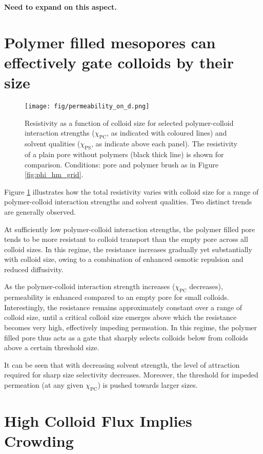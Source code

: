 \documentclass[12pt, a4paper]{article}
\begin{document}
\textbf{Need to expand on this aspect.}


\section{Polymer filled mesopores can effectively gate colloids by their size}

\begin{figure}
    \centering
    \texttt{[image: fig/permeability\_on\_d.png]}
    \caption{
    Resistivity as a function of colloid size for selected polymer-colloid interaction strengths ($\chi_{\text{PC}}$, as indicated with coloured lines) 
    and solvent qualities ($\chi_{\text{PS}}$, as indicate above each panel). 
    The resistivity of a plain pore without polymers (black thick line) is shown for comparison. 
    Conditions: pore and polymer brush as in Figure \ref{fig:phi_hm_grid}. 
    }
    \label{fig:R_vs_d}
\end{figure}

Figure \ref{fig:R_vs_d} illustrates how the total resistivity varies with colloid size for a range of polymer-colloid interaction strengths and solvent qualities. 
Two distinct trends are generally observed.

At sufficiently low polymer-colloid interaction strengths, the polymer filled pore tends to be more resistant to colloid transport than the empty pore across  all colloid sizes. 
In this regime, the resistance increases gradually yet substantially with colloid size, owing to a combination of enhanced osmotic repulsion and reduced diffusivity.

As the polymer-colloid interaction strength increases ($\chi_{\text{PC}}$ decreases), permeability is enhanced compared to an empty pore for small colloids. 
Interestingly, the resistance remains approximately constant over a range of colloid size, until a critical colloid size emerges above which the resistance becomes very high, 
effectively impeding permeation. 
In this regime, the polymer filled pore thus acts as a gate that sharply selects colloids below from colloids above a certain threshold size.

It can be seen that with decreasing solvent strength, the level of attraction required for sharp size selectivity decreases. 
Moreover, the threshold for impeded permeation (at any given $\chi_{\text{PC}}$) is pushed towards larger sizes.


\section{High Colloid Flux Implies Crowding}
\end{document}
